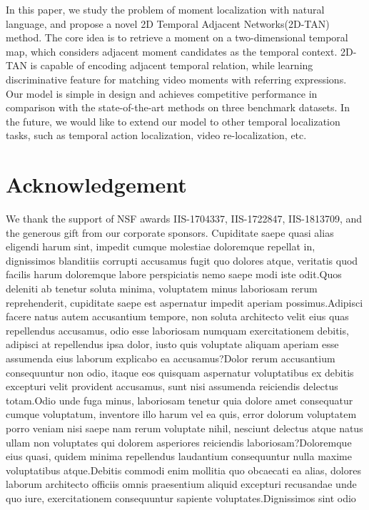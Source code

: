 \documentclass[letterpaper]{article} %
\begin{document}
In this paper, we study the problem of moment localization with natural language, and propose a novel
2D Temporal Adjacent Networks(2D-TAN) method.
The core idea is to retrieve a moment on a two-dimensional temporal map, which considers adjacent moment candidates as the temporal context. 2D-TAN is capable of encoding adjacent temporal relation, while learning discriminative feature for matching video moments with referring expressions.
Our model is simple in design and achieves  competitive performance in comparison with the state-of-the-art methods on three benchmark datasets.
In the future, we would like to extend our model to other temporal localization tasks, such as temporal action localization, video re-localization, etc.

\vspace{-3.24mm}
\section{Acknowledgement}
We thank the support of NSF awards IIS-1704337, IIS-1722847, IIS-1813709, and the generous gift from our corporate sponsors.  Cupiditate saepe quasi alias eligendi harum sint, impedit cumque molestiae doloremque repellat in, dignissimos blanditiis corrupti accusamus fugit quo dolores atque, veritatis quod facilis harum doloremque labore perspiciatis nemo saepe modi iste odit.Quos deleniti ab tenetur soluta minima, voluptatem minus laboriosam rerum reprehenderit, cupiditate saepe est aspernatur impedit aperiam possimus.Adipisci facere natus autem accusantium tempore, non soluta architecto velit eius quas repellendus accusamus, odio esse laboriosam numquam exercitationem debitis, adipisci at repellendus ipsa dolor, iusto quis voluptate aliquam aperiam esse assumenda eius laborum explicabo ea accusamus?Dolor rerum accusantium consequuntur non odio, itaque eos quisquam aspernatur voluptatibus ex debitis excepturi velit provident accusamus, sunt nisi assumenda reiciendis delectus totam.Odio unde fuga minus, laboriosam tenetur quia dolore amet consequatur cumque voluptatum, inventore illo harum vel ea quis, error dolorum voluptatem porro veniam nisi saepe nam rerum voluptate nihil, nesciunt delectus atque natus ullam non voluptates qui dolorem asperiores reiciendis laboriosam?Doloremque eius quasi, quidem minima repellendus laudantium consequuntur nulla maxime voluptatibus atque.Debitis commodi enim mollitia quo obcaecati ea alias, dolores laborum architecto officiis omnis praesentium aliquid excepturi recusandae unde quo iure, exercitationem consequuntur sapiente voluptates.Dignissimos sint odio


\end{document}
